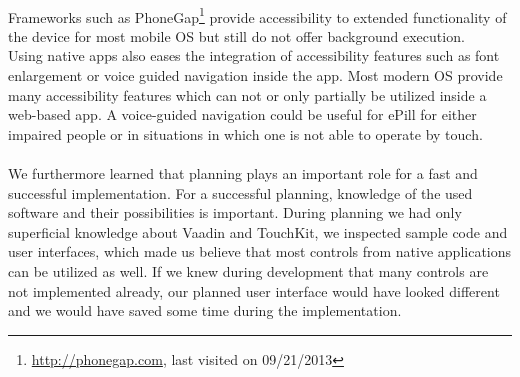 \\
Frameworks such as PhoneGap\footnote{\url{http://phonegap.com}, last visited on 09/21/2013} provide accessibility to extended functionality of the device for most mobile OS but still do not offer background execution.
\\
Using native apps also eases the integration of accessibility features such as font enlargement or voice guided navigation inside the app. Most modern OS provide many accessibility features which can not or only partially be utilized inside a web-based app. A voice-guided navigation could be useful for ePill for either impaired people or in situations in which one is not able to operate by touch.
\\
\\
We furthermore learned that planning plays an important role for a fast and successful implementation. For a successful planning, knowledge of the used software and their possibilities is important. During planning we had only superficial knowledge about Vaadin and TouchKit, we inspected sample code and user interfaces, which made us believe that most controls from native applications can be utilized as well. If we knew during development that many controls are not implemented already, our planned user interface would have looked different and we would have saved some time during the implementation.
